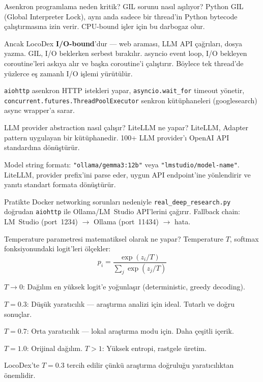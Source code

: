 \begin{mulakat}{Asenkron programlama neden kritik? GIL sorunu nas{\i}l a\c{s}{\i}l{\i}yor?}
Python GIL (Global Interpreter Lock), ayn{\i} anda sadece bir thread'in Python bytecode \c{c}al{\i}\c{s}t{\i}rmas{\i}na izin verir. CPU-bound i\c{s}ler i\c{c}in bu darbogaz olur.

Ancak LocoDex \textbf{I/O-bound}'dur --- web araması, LLM API \c{c}a\u{g}r{\i}lar{\i}, dosya yazma. GIL, I/O beklerken serbest b{\i}rak{\i}l{\i}r. asyncio event loop, I/O bekleyen coroutine'leri ask{\i}ya al{\i}r ve ba\c{s}ka coroutine'i \c{c}al{\i}\c{s}t{\i}r{\i}r. B\"{o}ylece tek thread'de y\"{u}zlerce e\c{s} zamanl{\i} I/O i\c{s}lemi y\"{u}r\"{u}t\"{u}l\"{u}r.

\texttt{aiohttp} asenkron HTTP istekleri yapar, \texttt{asyncio.wait\_for} timeout y\"{o}netir, \texttt{concurrent.futures.ThreadPoolExecutor} senkron k\"{u}t\"{u}phaneleri (googlesearch) async wrapper'a sarar.
\end{mulakat}

\begin{mulakat}{LLM provider abstraction nas{\i}l \c{c}al{\i}\c{s}{\i}r? LiteLLM ne yapar?}
LiteLLM, Adapter pattern uygulayan bir k\"{u}t\"{u}phanedir. 100+ LLM provider'{\i} OpenAI API standard{\i}na d\"{o}n\"{u}\c{s}t\"{u}r\"{u}r.

Model string format{\i}: \texttt{"ollama/gemma3:12b"} veya \texttt{"lmstudio/model-name"}. LiteLLM, provider prefix'ini parse eder, uygun API endpoint'ine y\"{o}nlendirir ve yan{\i}t{\i} standart formata d\"{o}n\"{u}\c{s}t\"{u}r\"{u}r.

Pratikte Docker networking sorunlar{\i} nedeniyle \texttt{real\_deep\_research.py} do\u{g}rudan \texttt{aiohttp} ile Ollama/LM~Studio API'lerini \c{c}a\u{g}{\i}r{\i}r. Fallback chain: LM~Studio (port~1234) $\rightarrow$ Ollama (port~11434) $\rightarrow$ hata.
\end{mulakat}

\begin{mulakat}{Temperature parametresi matematiksel olarak ne yapar?}
Temperature $T$, softmax fonksiyonundaki logit'leri \"{o}l\c{c}ekler:
\begin{equation}
  p_i = \frac{\exp(z_i / T)}{\sum_j \exp(z_j / T)}
\end{equation}

$T \to 0$: Da\u{g}{\i}l{\i}m en y\"{u}ksek logit'e yo\u{g}unla\c{s}{\i}r (deterministic, greedy decoding).

$T = 0.3$: D\"{u}\c{s}\"{u}k yarat{\i}c{\i}l{\i}k --- ara\c{s}t{\i}rma analizi i\c{c}in ideal. Tutarl{\i} ve do\u{g}ru sonu\c{c}lar.

$T = 0.7$: Orta yarat{\i}c{\i}l{\i}k --- lokal ara\c{s}t{\i}rma modu i\c{c}in. Daha \c{c}e\c{s}itli i\c{c}erik.

$T = 1.0$: Orijinal da\u{g}{\i}l{\i}m. $T > 1$: Y\"{u}ksek entropi, rastgele \"{u}retim.

LocoDex'te $T=0.3$ tercih edilir \c{c}\"{u}nk\"{u} ara\c{s}t{\i}rma do\u{g}rulu\u{g}u yarat{\i}c{\i}l{\i}ktan \"{o}nemlidir.
\end{mulakat}

